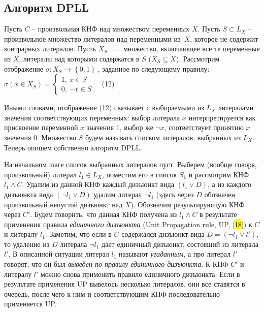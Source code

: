 \subsection{Алгоритм DPLL}

Пусть $C$ \--- произвольная КНФ над множеством переменных $X$. Пусть $S \subset L_{X}$ \--- произвольное множество литералов над переменными из~$X$, которое не содержит контрарных литералов. Пусть $X_{S}$ \=== множество, включающее все те переменные из $X$, литералы над которыми содержатся в $S$ ($X_{S} \subseteq X$). Рассмотрим отображение
$\sigma \colon X_{S} \to \left\{ 0,1 \right\}\ $,
заданное по следующему правилу:
\(
    \sigma\left( x \in X_{S} \right) = \left\{ \begin{array}{r}
    1,\ x \in S\ \ \ \ \  \\
    0,\ \neg x \in S\ .
    \end{array} \right.\
\) (12)

Иными словами, отображение (12) связывает с выбираемыми из $L_{X}$ литералами значения соответствующих переменных: выбор литерала $x$ интерпретируется как присвоение переменной $x$ значения 1, выбор же $\neg x$, соответствует принятию $x$ значения 0. Множество $S$ будем называть списком литералов, выбранных из $L_{X}$. Теперь опишем собственно алгоритм DPLL.

На начальном шаге список выбранных литералов пуст. Выберем (вообще говоря, произвольный) литерал $l_{1} \in L_{X}$, поместим его в список $S_{1}$ и рассмотрим КНФ $l_{1} \land C$. Удалим из данной КНФ каждый дизъюнкт вида $\left( l_{1} \lor D \right)$, а из каждого дизъюнкта вида $\left( \neg l_{1} \lor D \right)$ удалим литерал $\neg l_{1}$ (здесь через $D$ обозначен произвольный непустой дизъюнкт над $X$). Обозначим результирующую КНФ через $C'$. Будем говорить, что данная КНФ получена из $l_{1} \land C$ в результате применения правила \textit{единичного дизъюнкта} (Unit Propagation rule, UP, {[}\hl{18}{]}) к $C$ и литералу $l_{1}$. Заметим, что если в $C$ содержался дизъюнкт вида $D = \left( \neg l_{1} \lor l' \right)$, то удаление из $D$ литерала $\neg l_{1}$ дает единичный дизъюнкт, состоящий из литерала $l'$. В описанной ситуации литерал $l_{1}$ называют \textit{угаданным}, а про литерал $l'$ говорят, что он был \textit{выведен по правилу единичного дизъюнкта}. К КНФ $C'$ и литералу $l'$ можно снова применить правило единичного дизъюнкта. Если в результате применения UP вывелось несколько литералов, они все ставятся в очередь, после чего к ним и соответствующим КНФ последовательно применяется UP.

